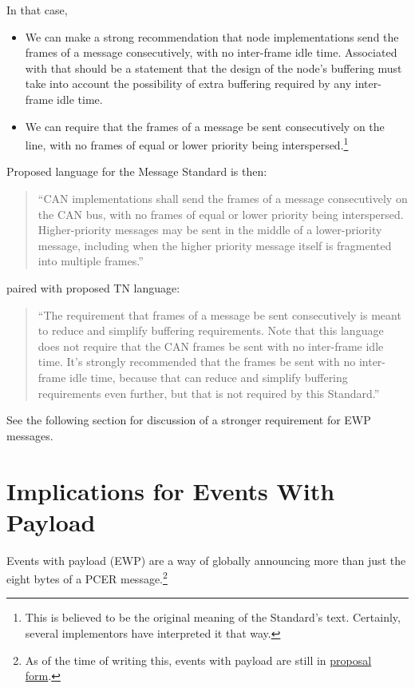 \documentclass[11pt]{article}
\begin{document}
In that case, 
\begin{itemize}
\item We can make a strong recommendation that node implementations send the frames
    of a message consecutively, with no inter-frame idle time.  Associated with that
    should be a statement that the design of the node's buffering must take 
    into account the possibility of extra buffering required by any 
    inter-frame idle time.
\item We can require that the frames of a message be sent consecutively
    on the line, with no frames of equal or lower priority being 
    interspersed.\footnote{This is believed to be the original meaning of the 
                    Standard's text. Certainly, several implementors have 
                    interpreted it that way.}
\end{itemize}

Proposed language for the Message Standard is then:
\begin{quote}
    ``CAN implementations shall send the frames of a message consecutively on the CAN bus, 
    with no frames of equal or lower priority being interspersed. 
    Higher-priority messages may be sent in the middle of a lower-priority message, 
    including when the higher priority message itself is fragmented into multiple frames.” 
\end{quote}
paired with proposed TN language:
\begin{quote}
    ``The requirement that frames of a message be sent consecutively is meant to reduce
    and simplify buffering requirements. Note that this language does
    not require that the CAN frames be sent with no inter-frame idle time.
    It's strongly recommended that the frames be sent with no inter-frame idle time, because
    that can reduce and simplify buffering requirements even further, but that
    is not required by this Standard.” 
\end{quote}

See the following section for discussion of a stronger requirement for 
EWP messages.

\section{Implications for Events With Payload}

Events with payload (EWP) are a way of globally announcing more than 
just the eight bytes of a PCER 
message.\footnote{As of the time of writing this, events with payload are still in
    \href{https://github.com/openlcb/documents/pull/94}{proposal form}.
    }
\end{document}
